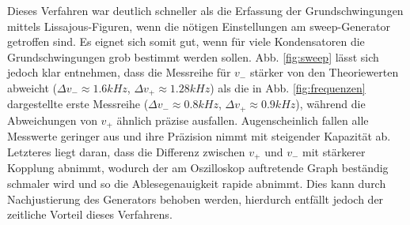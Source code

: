 Dieses Verfahren war deutlich schneller als die Erfassung der Grundschwingungen mittels Lissajous-Figuren, wenn die nötigen Einstellungen am sweep-Generator getroffen sind. Es eignet sich somit gut, wenn für viele Kondensatoren die Grundschwingungen grob bestimmt werden sollen. Abb. \ref{fig:sweep} lässt sich jedoch klar entnehmen, dass die Messreihe für $v_-$ stärker von den Theoriewerten abweicht ($\Delta v_- \approx 1.6kHz$, $\Delta v_+ \approx 1.28 kHz$) als die in Abb. \ref{fig:frequenzen} dargestellte erste Messreihe ($\Delta v_- \approx 0.8kHz$, $\Delta v_+ \approx 0.9kHz$), während die Abweichungen von $v_+$ ähnlich präzise ausfallen. Augenscheinlich fallen alle Messwerte geringer aus und ihre Präzision nimmt mit steigender Kapazität ab. Letzteres liegt daran, dass die Differenz zwischen $v_+$ und $v_-$ mit stärkerer Kopplung abnimmt, wodurch der am Oszilloskop auftretende Graph beständig schmaler wird und so die Ablesegenauigkeit rapide abnimmt. Dies kann durch Nachjustierung des Generators behoben werden, hierdurch entfällt jedoch der zeitliche Vorteil dieses Verfahrens.
